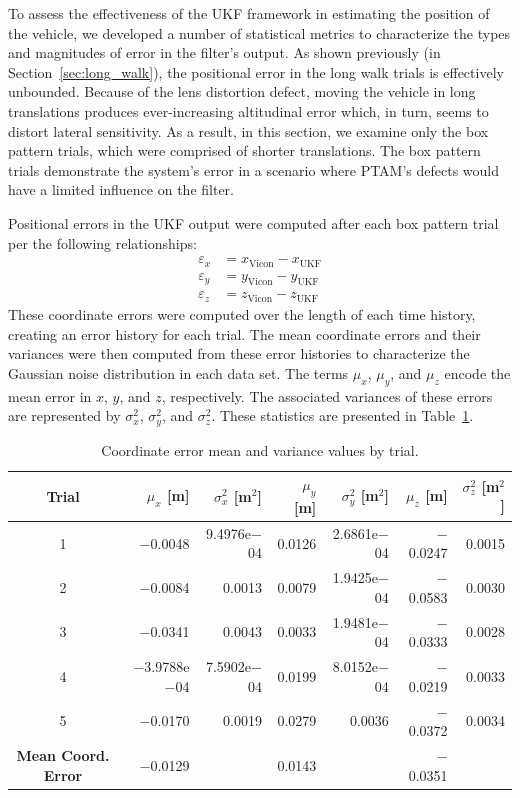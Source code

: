 To assess the effectiveness of the UKF framework in estimating the position of the vehicle, we developed a number of statistical metrics to characterize the types and magnitudes of error in the filter's output. As shown previously (in Section~\ref{sec:long_walk}), the positional error in the long walk trials is effectively unbounded. Because of the lens distortion defect, moving the vehicle in long translations produces ever-increasing altitudinal error which, in turn, seems to distort lateral sensitivity. As a result, in this section, we examine only the box pattern trials, which were comprised of shorter translations. The box pattern trials demonstrate the system's error in a scenario where PTAM's defects would have a limited influence on the filter.

Positional errors in the UKF output were computed after each box pattern trial per the following relationships:
%
\begin{align}
\varepsilon_{x} &= x_{\text{Vicon}} - x_{\text{UKF}} \\
\varepsilon_{y} &= y_{\text{Vicon}} - y_{\text{UKF}} \\
\varepsilon_{z} &= z_{\text{Vicon}} - z_{\text{UKF}}
\end{align}
%
These coordinate errors were computed over the length of each time history, creating an error history for each trial. The mean coordinate errors and their variances were then computed from these error histories to characterize the Gaussian noise distribution in each data set. The terms $\mu_{x}$, $\mu_{y}$, and $\mu_{z}$ encode the mean error in $x$, $y$, and $z$, respectively. The associated variances of these errors are represented by $\sigma_{x}^{2}$, $\sigma_{y}^{2}$, and $\sigma_{z}^{2}$. These statistics are presented in Table~\ref{tab:means_and_vars}.

\begin{table}[h]\centering
\caption[Coordinate Error Mean and Variance Values by Trial]{Coordinate error mean and variance values by trial.}
\begin{tabular}[c]{crr|rr|rr}
\toprule
Trial & $\mu_{x}$ [m] & $\sigma_{x}^{2}$ [m$^{2}$] & $\mu_{y}$ [m] & $\sigma_{y}^{2}$ [m$^{2}$] & $\mu_{z}$ [m] & $\sigma_{z}^{2}$ [m$^{2}$] \\
\hline
1 & $-$0.0048 & 9.4976e$-$04 & 0.0126 & 2.6861e$-$04 & $-$0.0247 & 0.0015 \\
2 & $-$0.0084 & 0.0013 & 0.0079 & 1.9425e$-$04 & $-$0.0583 & 0.0030 \\
3 & $-$0.0341 & 0.0043 & 0.0033 & 1.9481e$-$04 & $-$0.0333 & 0.0028 \\
4 & $-$3.9788e$-$04 & 7.5902e$-$04 & 0.0199 & 8.0152e$-$04 & $-$0.0219 & 0.0033 \\
5 & $-$0.0170 & 0.0019 & 0.0279 & 0.0036 & $-$0.0372 & 0.0034 \\
\hline
\textbf{Mean Coord. Error} & $-$0.0129 &  & 0.0143 &  & $-$0.0351 & \\
\bottomrule
\end{tabular}
\label{tab:means_and_vars}
\end{table}

